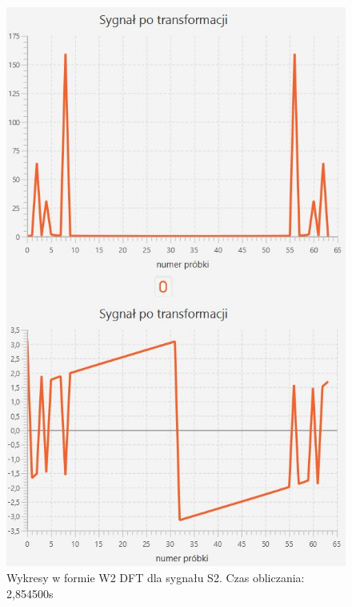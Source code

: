 \documentclass[12pt]{article}
\begin{document}
\begin{figure}[H]
	\centering
	\includegraphics[width=.8\linewidth]{DFT-S2-W2}
	\caption{Wykresy w formie W2 DFT dla sygnału S2. Czas obliczania: 2,854500s}
	\label{S3_sygnal}
\end{figure}
\end{document}
